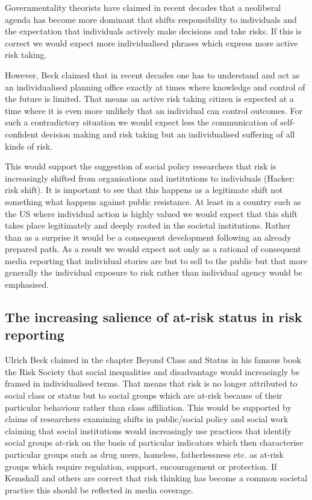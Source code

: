 \documentclass{report}
\begin{document}
Governmentality theorists have claimed in recent decades that a neoliberal agenda has become more dominant that shifts responsibility to individuals and the expectation that individuals actively make decisions and take risks. If this is correct we would expect more individualised phrases which express more active risk taking. 

However, Beck claimed that in recent decades one has to understand and act as an individualised planning office exactly at times where knowledge and control of the future is limited. That means an active risk taking citizen is expected at a time where it is even more unlikely that an individual can control outcomes. For such a contradictory situation we would expect less the communication of self-confident decision making and risk taking but an individualised suffering of all kinds of risk. 

This would support the suggestion of social policy researchers that risk is increasingly shifted from organisations and institutions to individuals (Hacker: risk shift). It is important to see that this happens as a legitimate shift not something what happens against public resistance. At least in a country such as the US where individual action is highly valued we would expect that this shift takes place legitimately and deeply rooted in the societal institutions. Rather than as a surprise it would be a consequent development following an already prepared path. As a result we would expect not only as a rational of consequent media reporting that individual stories are but to sell to the public but that more generally the individual exposure to risk rather than individual agency would be emphasised. 

\subsection*{The increasing salience of at-risk status in risk reporting}

Ulrich Beck claimed in the chapter Beyond Class and Status in his famous book the Risk Society that social inequalities and disadvantage would increasingly be framed in individualised terms. That means that risk is no longer attributed to social class or status but to social groups which are at-risk because of their particular behaviour rather than class affiliation. 
This would be supported by claims of researchers examining shifts in public\slash social policy and social work claiming that social institutions would increasingly use practices that identify social groups at-risk on the basis of particular indicators which then characterise particular groups such as drug users, homeless, fatherlessness etc. as at-risk groups which require regulation, support, encouragement or protection. If Kemshall and others are correct that risk thinking has become a common societal practice this should be reflected in media coverage.
\end{document}
